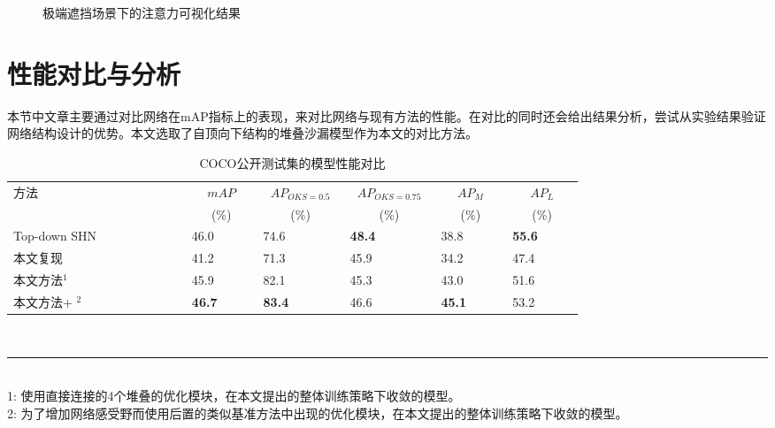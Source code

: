 \begin{figure}[H]
\begin{minipage}{0.05\linewidth}
		\vskip2cm
	\end{minipage}
	\caption{极端遮挡场景下的注意力可视化结果}
	\label{fig:failcase}
\end{figure}


\section{性能对比与分析}
\label{sec:perfcompare}
本节中文章主要通过对比网络在mAP指标上的表现，来对比网络与现有方法的性能。在对比的同时还会给出结果分析，尝试从实验结果验证网络结构设计的优势。本文选取了自顶向下结构的堆叠沙漏模型作为本文的对比方法。
\begin{table*}[ht]
	\centering
	\caption{COCO公开测试集的模型性能对比}
	\label{tab:mAPCOCObenchmark}
	\begin{minipage}[t]{0.8\linewidth}
		\begin{tabular}{p{0.25\linewidth}p{0.1\linewidth}<{\centering}p{0.1\linewidth}<{\centering}p{0.1\linewidth}<{\centering}p{0.1\linewidth}<{\centering}p{0.1\linewidth}<{\centering}}
			\hline
			方法 & \multicolumn{1}{c}{$mAP$} & \multicolumn{1}{c}{$AP_{OKS=0.5}$} & \multicolumn{1}{c}{$AP_{OKS=0.75}$}
			& \multicolumn{1}{c}{$AP_M$} & \multicolumn{1}{c}{$AP_L$} \\
			
			& \multicolumn{1}{c}{(\%)}& \multicolumn{1}{c}{(\%)}&
			\multicolumn{1}{c}{(\%)}& \multicolumn{1}{c}{(\%)}& \multicolumn{1}{c}{
				(\%)}\\
			\hline
			Top-down SHN\cite{newell2016stacked} & 46.0 & 74.6 & \textbf{48.4} & 38.8  & \textbf{55.6} \\
			本文复现 & 41.2 & 71.3 & 45.9 & 34.2 & 47.4 \\
			本文方法$^1$ & 45.9 & 82.1 & 45.3 & 43.0 & 51.6 \\
			本文方法+ $^2$ & \textbf{46.7} & \textbf{83.4} & 46.6 & \textbf{45.1} & 53.2 \\
			\hline
		\end{tabular}\\[2pt]
		\noindent\rule{0.25\linewidth}{1pt} \\
		\footnotesize
		1: 使用直接连接的4个堆叠的优化模块，在本文提出的整体训练策略下收敛的模型。\\
		2: 为了增加网络感受野而使用后置的类似基准方法中出现的优化模块，在本文提出的整体训练策略下收敛的模型。
	\end{minipage}
\end{table*}


